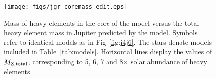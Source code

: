 \begin{figure}[h]
\centering

\texttt{[image: figs/jgr\_coremass\_edit.eps]}

\caption{Mass of heavy elements in the core of the model versus the total heavy
    element mass in Jupiter predicted by the model. Symbols refer to identical models
    as in Fig~\ref{fig:j4j6}. The stars denote models included in
    Table~\ref{tab:models}.  Horizontal lines display the values of $M_{\rm
    Z,total}$, corresponding to 5, 6, 7 and 8$\times$ solar abundance of heavy elements.
}
\label{fig:coremass}
\end{figure}

%


